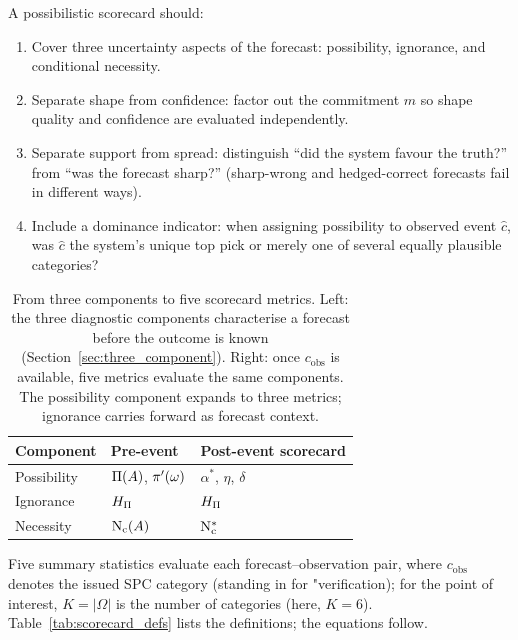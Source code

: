 \begin{workedexample}
A possibilistic scorecard should:
\begin{enumerate}[leftmargin=2em, label=(\roman*)]
\item Cover three uncertainty aspects of the forecast:
    possibility, ignorance, and conditional necessity.
\item Separate shape from confidence: factor out the commitment
    $m$ so shape quality and confidence are evaluated
    independently.
\item Separate support from spread: distinguish ``did
    the system favour the truth?'' from ``was the
    forecast sharp?'' (sharp-wrong and hedged-correct
    forecasts fail in different ways).
\item Include a dominance indicator: when assigning
    possibility to observed event $\hat{c}$,
    was $\hat{c}$ the system's unique top pick or
    merely one of several equally plausible categories?
\end{enumerate}
\end{workedexample}

\begin{table}[htbp]
\centering
\caption{From three components to five scorecard metrics. Left: the
    three diagnostic components characterise a forecast before the
    outcome is known (Section~\ref{sec:three_component}). Right: once
    $c_{\mathrm{obs}}$ is available, five metrics evaluate the same
    components. The possibility component expands to three metrics;
    ignorance carries forward as forecast context.}
\label{tab:three_to_five}
\small
\begin{tabular}{lll}
\toprule
Component & Pre-event & Post-event scorecard \\
\midrule
Possibility & $\Pi(A)$, $\pi'(\omega)$
    & $\alpha^*$, $\eta$, $\delta$ \\
Ignorance & $H_{\Pi}$   & $H_{\Pi}$ \\
Necessity & $\mathrm{N}_{\mathrm{c}}(A)$  & $\mathrm{N}_{\mathrm{c}}^*$ \\
\bottomrule
\end{tabular}
\end{table}

Five summary statistics evaluate each
forecast--observation pair, where $c_{\mathrm{obs}}$
denotes the issued SPC category (standing in for
"verification); for the point of interest,
$K = |\Omega|$ is the number of categories
(here, $K = 6$).
Table~\ref{tab:scorecard_defs} lists the definitions;
the equations follow.

